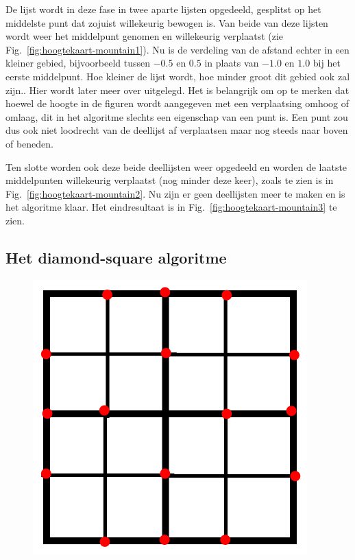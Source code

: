 \documentclass{article}
\begin{document}
De lijst wordt in deze fase in twee aparte lijsten opgedeeld, gesplitst op het middelste punt dat zojuist willekeurig bewogen is. Van beide van deze lijsten wordt weer het middelpunt genomen en willekeurig verplaatst (zie Fig.~\ref{fig:hoogtekaart-mountain1}). Nu is de verdeling van de afstand echter in een kleiner gebied, bijvoorbeeld tussen $-0.5$ en $0.5$ in plaats van $-1.0$ en $1.0$ bij het eerste middelpunt. Hoe kleiner de lijst wordt, hoe minder groot dit gebied ook zal zijn.. Hier wordt later meer over uitgelegd. Het is belangrijk om op te merken dat hoewel de hoogte in de figuren wordt aangegeven met een verplaatsing omhoog of omlaag, dit in het algoritme slechts een eigenschap van een punt is. Een punt zou dus ook niet loodrecht van de deellijst af verplaatsen maar nog steeds naar boven of beneden.

Ten slotte worden ook deze beide deellijsten weer opgedeeld en worden de laatste middelpunten willekeurig verplaatst (nog minder deze keer), zoals te zien is in Fig.~\ref{fig:hoogtekaart-mountain2}. Nu zijn er geen deellijsten meer te maken en is het algoritme klaar. Het eindresultaat is in Fig.~\ref{fig:hoogtekaart-mountain3} te zien.

\subsection{Het diamond-square algoritme}

\begin{figure}
  \includegraphics[width=0.9\linewidth]{hoogtekaart-2d.png}
  \caption{\cite{hoogtekaart-illustratie}}
  \label{fig:hoogtekaart-2d}
\end{figure}
\end{document}
